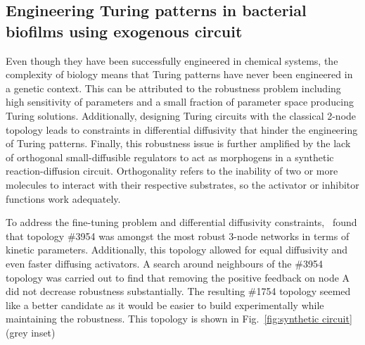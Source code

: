 \subsection{Engineering Turing patterns in bacterial biofilms using exogenous circuit}
Even though they have been successfully engineered in chemical systems, the complexity of biology means that Turing patterns have never been engineered in a genetic context.
This can be attributed to the robustness problem including high sensitivity of parameters and a small fraction of parameter space producing Turing solutions.
Additionally, designing Turing circuits with the classical 2-node topology leads to constraints in differential diffusivity that hinder the engineering of Turing patterns.
Finally, this robustness issue is further amplified by the lack of orthogonal small-diffusible regulators to act as morphogens in a synthetic reaction-diffusion circuit.
Orthogonality refers to the inability of two or more molecules to interact with their respective substrates, so the activator or inhibitor functions work adequately.
%

To address the fine-tuning problem and differential diffusivity constraints,~\cite{Scholes2019} found that topology \#3954 was amongst the most robust 3-node networks in terms of kinetic parameters. %
Additionally, this topology allowed for equal diffusivity and even faster diffusing activators.
A search around neighbours of the \#3954 topology was carried out to find that removing the positive feedback on node A did not decrease robustness substantially.
The resulting \#1754 topology seemed like a better candidate as it would be easier to build experimentally while maintaining the robustness.
This topology is shown in Fig.~\ref{fig:synthetic circuit} (grey inset)


